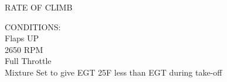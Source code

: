 \begin{figure}[t]
\begin{center}
\begin{perfhdr}RATE OF CLIMB
\end{perfhdr}
\Large
\vspace{5ex}
\begin{minipage}{4in}
  \begin{flushleft}
    CONDITIONS:\\
    Flaps UP\\
    2650 RPM\\
    Full Throttle\\
    Mixture Set to give EGT 25\textdegree F less than EGT during take-off\\
    \end{flushleft}
  \end{minipage}
\hfill
\\
\vspace{\perfnoteskip}

\settowidth{\colOne}{WEIGHT}
\settowidth{\colTwo}{PRESSURE}
\settowidth{\colThree}{CLIMB}
\settowidth{\colFour}{-20\textdegree C}
\settowidth{\colFive}{9,999}
\settowidth{\colSix}{9,999}
\settowidth{\colSeven}{9,999}


\end{center}
\end{figure}
